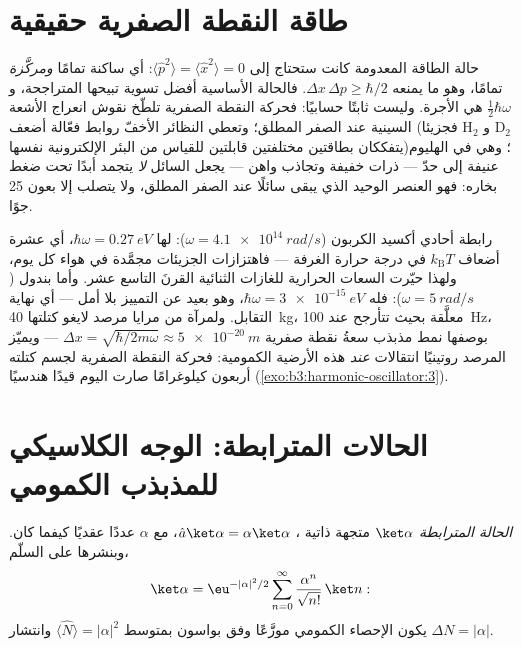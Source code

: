 \section{طاقة النقطة الصفرية حقيقية}

\begin{remark}\label{rem:b3:harmonic-oscillator:zeropoint}
حالة الطاقة المعدومة كانت ستحتاج إلى $\langle\hat p^2\rangle =
\langle\hat x^2\rangle = 0$: أي ساكنة تمامًا \emph{ومركَّزة}
تمامًا، وهو ما يمنعه $\Delta x\,\Delta p \ge \hbar/2$. فالحالة
الأساسية أفضل تسوية تبيحها المتراجحة، و
$\tfrac12\hbar\omega$ هي الأجرة. وليست ثابتًا حسابيًا:
فحركة النقطة الصفرية تلطّخ نقوش انعراج الأشعة السينية عند الصفر
المطلق؛ وتعطي النظائر الأخفّ روابط فعّالة أضعف (فجزيئا H$_2$ و
D$_2$ يتفككان بطاقتين مختلفتين قابلتين للقياس من البئر
الإلكترونية نفسها)؛ وهي في الهليوم عنيفة إلى حدّ --- ذرات خفيفة
وتجاذب واهن --- يجعل السائل \emph{لا} يتجمد أبدًا تحت ضغط
بخاره: فهو العنصر الوحيد الذي يبقى سائلًا عند الصفر
المطلق، ولا يتصلب إلا بعون 25 جوًا.
\end{remark}

\begin{example}\label{ex:b3:harmonic-oscillator:scales}
رابطة أحادي أكسيد الكربون ($\omega = \qty{4.1e14}{rad/s}$): لها $\hbar\omega =
\qty{0.27}{eV}$، أي عشرة أضعاف $k_{\text{B}}T$ في درجة حرارة الغرفة ---
فاهتزازات الجزيئات مجمَّدة في هواء كل يوم، ولهذا حيّرت
السعات الحرارية للغازات الثنائية القرنَ التاسع عشر. وأما بندول
($\omega = \qty{5}{rad/s}$): فله $\hbar\omega = \qty{3e-15}{eV}$،
وهو بعيد عن التمييز بلا أمل --- أي نهاية التقابل. ولمرآة من مرايا
مرصد لايغو كتلتها \qty{40}{kg}، معلَّقة بحيث تتأرجح عند
\qty{100}{Hz}، بوصفها نمط مذبذب سعةُ نقطة صفرية $\Delta x =
\sqrt{\hbar/2m\omega} \approx \qty{5e-20}{m}$ --- ويميّز المرصد
روتينيًا انتقالات \emph{عند} هذه الأرضية الكمومية: فحركة
النقطة الصفرية لجسم كتلته أربعون كيلوغرامًا صارت اليوم قيدًا
هندسيًا (\cref{exo:b3:harmonic-oscillator:3}).
\end{example}

\section{الحالات المترابطة: الوجه الكلاسيكي للمذبذب الكمومي}

\begin{definition}\label{def:b3:harmonic-oscillator:coherent}
\emph{الحالة المترابطة} $\ket\alpha$ متجهة ذاتية ، $\hat a\ket\alpha = \alpha\ket\alpha$، مع
$\alpha$ عددًا عقديًا كيفما كان. وبنشرها على السلّم،
\[
\ket\alpha = \eu^{-|\alpha|^2/2}\sum_{n=0}^\infty
\frac{\alpha^n}{\sqrt{n!}}\,\ket n :
\]
يكون الإحصاء الكمومي موزَّعًا وفق بواسون بمتوسط $\langle\hat
N\rangle = |\alpha|^2$ وانتشار $\Delta N = |\alpha|$.
\end{definition}

